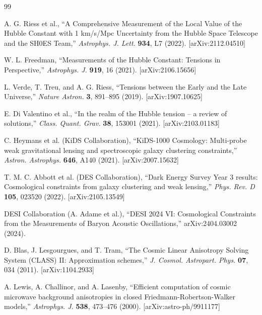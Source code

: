 \documentclass[11pt,a4paper]{article}
\theoremstyle{definition}
\theoremstyle{remark}
\begin{document}
\begin{thebibliography}{99}

A. G. Riess et al.,
``A Comprehensive Measurement of the Local Value of the Hubble Constant with 1 km/s/Mpc Uncertainty from the Hubble Space Telescope and the SH0ES Team,''
\emph{Astrophys. J. Lett.} \textbf{934}, L7 (2022).
[arXiv:2112.04510]

W. L. Freedman,
``Measurements of the Hubble Constant: Tensions in Perspective,''
\emph{Astrophys. J.} \textbf{919}, 16 (2021).
[arXiv:2106.15656]

L. Verde, T. Treu, and A. G. Riess,
``Tensions between the Early and the Late Universe,''
\emph{Nature Astron.} \textbf{3}, 891--895 (2019).
[arXiv:1907.10625]

E. Di Valentino et al.,
``In the realm of the Hubble tension -- a review of solutions,''
\emph{Class. Quant. Grav.} \textbf{38}, 153001 (2021).
[arXiv:2103.01183]


C. Heymans et al. (KiDS Collaboration),
``KiDS-1000 Cosmology: Multi-probe weak gravitational lensing and spectroscopic galaxy clustering constraints,''
\emph{Astron. Astrophys.} \textbf{646}, A140 (2021).
[arXiv:2007.15632]

T. M. C. Abbott et al. (DES Collaboration),
``Dark Energy Survey Year 3 results: Cosmological constraints from galaxy clustering and weak lensing,''
\emph{Phys. Rev. D} \textbf{105}, 023520 (2022).
[arXiv:2105.13549]


DESI Collaboration (A. Adame et al.),
``DESI 2024 VI: Cosmological Constraints from the Measurements of Baryon Acoustic Oscillations,''
arXiv:2404.03002 (2024).


D. Blas, J. Lesgourgues, and T. Tram,
``The Cosmic Linear Anisotropy Solving System (CLASS) II: Approximation schemes,''
\emph{J. Cosmol. Astropart. Phys.} \textbf{07}, 034 (2011).
[arXiv:1104.2933]

A. Lewis, A. Challinor, and A. Lasenby,
``Efficient computation of cosmic microwave background anisotropies in closed Friedmann-Robertson-Walker models,''
\emph{Astrophys. J.} \textbf{538}, 473--476 (2000).
[arXiv:astro-ph/9911177]

\end{thebibliography}
\end{document}
